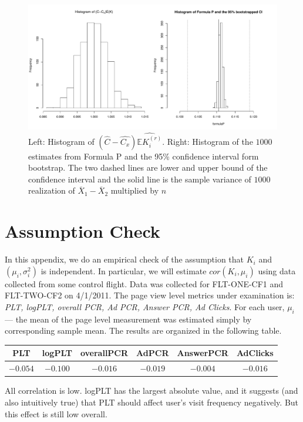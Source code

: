 \documentclass[12pt,letterpaper]{article}
\newcommand{\wht}{\widehat}
\newcommand{\bbe}{\mathbb{E}}
\newcommand{\xbar}{\overline{X}}
\begin{document}
\begin{figure}[!hbtp]
  \centering
  \includegraphics[width=\textwidth]{kfixed5}
    \caption{Left: Histogram of $(\wht{C}-\wht{C_x})\wht{\bbe K_i^{(r)}}$. Right: Histogram of the $1000$ estimates from Formula P and the 95\% confidence interval form bootstrap. The two dashed lines are lower and upper bound of the confidence interval and the solid line is the sample variance of $1000$ realization of $\xbar_1-\xbar_2$ multiplied by $n$}
  \label{fig:kfixed5}
\end{figure}


\appendix
\section{Assumption Check}
In this appendix, we do an empirical check of the assumption that $K_i$ and $(\mu_i, \sigma_i^2)$ is independent. In particular, we will estimate $cor(K_i, \mu_i)$ using data collected from some control flight. Data was collected for FLT-ONE-CF1 and FLT-TWO-CF2 on 4/1/2011. The page view level metrics under examination is: \emph{PLT, logPLT, overall PCR, Ad PCR, Answer PCR, Ad Clicks}. For each user, $\mu_i$ --- the mean of the page level measurement was estimated simply by corresponding sample mean. The results are organized in the following table.
\begin{center}
   \begin{tabular}{| c|c| c| c| c | c |}
\hline
   PLT & logPLT& overallPCR& AdPCR& AnswerPCR& AdClicks\\
  \hline
 $-0.054$& $-0.100$&$-0.016$&$-0.019$&$-0.004$&$-0.016$\\
     \hline
   \end{tabular}
 \end{center}

All correlation is low. logPLT has the largest absolute value, and it suggests (and also intuitively true) that PLT should affect user's visit frequency negatively. But this effect is still low overall.  
\end{document}
